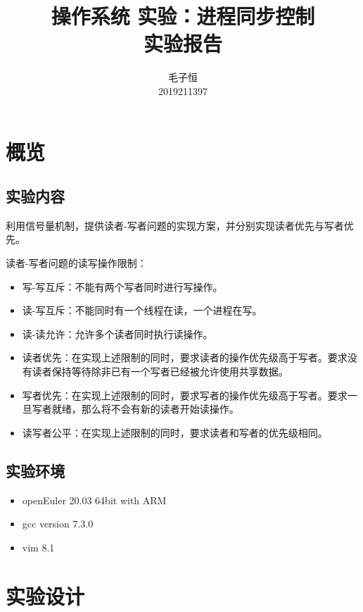 \documentclass[lang=cn,11pt,a4paper,cite=authornum]{paper}
\title{操作系统 实验：进程同步控制 \\ 实验报告}
\author{毛子恒 \\ 2019211397}
\institute{北京邮电大学\ 计算机学院}
\date{\zhtoday}
\begin{document}
\maketitle

\section{概览}

\subsection{实验内容}

利用信号量机制，提供读者-写者问题的实现方案，并分别实现读者优先与写者优先。

读者-写者问题的读写操作限制：

\begin{itemize}
    \item 写-写互斥：不能有两个写者同时进行写操作。
    \item 读-写互斥：不能同时有一个线程在读，一个进程在写。 
    \item 读-读允许：允许多个读者同时执行读操作。
\end{itemize}

\begin{itemize}
    \item 读者优先：在实现上述限制的同时，要求读者的操作优先级高于写者。要求没有读者保持等待除非已有一个写者已经被允许使用共享数据。
    \item 写者优先：在实现上述限制的同时，要求写者的操作优先级高于写者。要求一旦写者就绪，那么将不会有新的读者开始读操作。
    \item 读写者公平：在实现上述限制的同时，要求读者和写者的优先级相同。
\end{itemize}


\subsection{实验环境}

\begin{itemize}
    \item openEuler 20.03 64bit with ARM
    \item gcc version 7.3.0
    \item vim 8.1
\end{itemize}

\section{实验设计}
\end{document}

